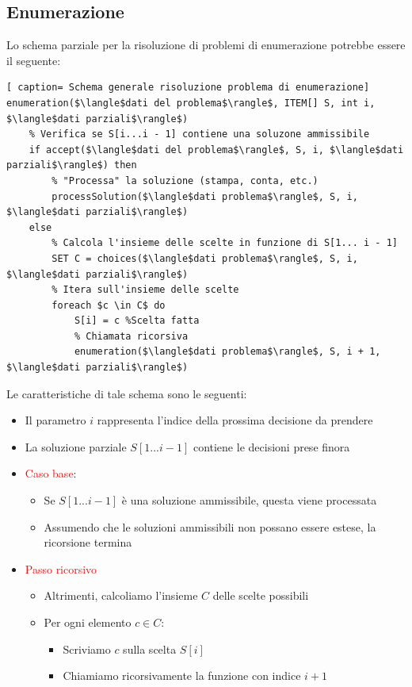 \documentclass[../cheatSheetAlgoritmi.tex]{subfiles}
\begin{document}
\subsection{Enumerazione}
Lo schema parziale per la risoluzione di problemi di enumerazione potrebbe essere il seguente: 
 \begin{lstlisting}[ caption= Schema generale risoluzione problema di enumerazione]
enumeration($\langle$dati del problema$\rangle$, ITEM[] S, int i, $\langle$dati parziali$\rangle$)
	% Verifica se S[i...i - 1] contiene una soluzone ammissibile
	if accept($\langle$dati del problema$\rangle$, S, i, $\langle$dati parziali$\rangle$) then
		% "Processa" la soluzione (stampa, conta, etc.)
		processSolution($\langle$dati problema$\rangle$, S, i, $\langle$dati parziali$\rangle$)
	else
		% Calcola l'insieme delle scelte in funzione di S[1... i - 1]
		SET C = choices($\langle$dati problema$\rangle$, S, i, $\langle$dati parziali$\rangle$)
		% Itera sull'insieme delle scelte
		foreach $c \in C$ do
			S[i] = c %Scelta fatta
			% Chiamata ricorsiva
			enumeration($\langle$dati problema$\rangle$, S, i + 1, $\langle$dati parziali$\rangle$)
\end{lstlisting}
Le caratteristiche di tale schema sono le seguenti: 
\begin{itemize}
	\item Il parametro $i$ rappresenta l'indice della prossima decisione da prendere
	\item La soluzione parziale $S[1...i - 1]$ contiene le decisioni prese finora
	\item \textcolor{red}{Caso base}:
	\begin{itemize}
		\item Se $S[1... i - 1]$ è una soluzione ammissibile, questa viene processata
		\item Assumendo che le soluzioni ammissibili non possano essere estese, la ricorsione termina
	\end{itemize}
	\item \textcolor{red}{Passo ricorsivo}
	\begin{itemize}
		\item Altrimenti, calcoliamo l’insieme $C$ delle scelte possibili
		\item Per ogni elemento $c \in C$:
		\begin{itemize}
			\item Scriviamo $c$ sulla scelta $S[i]$
			\item Chiamiamo ricorsivamente la funzione con indice $i+ 1$
		\end{itemize}
	\end{itemize}
\end{itemize}
\end{document}
